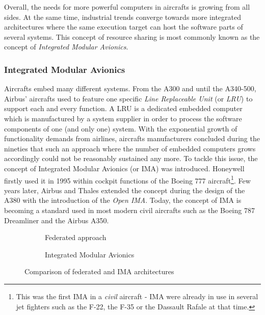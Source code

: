 \documentclass[main.tex]{subfiles}
\begin{document}
Overall, the needs for more powerful computers in aircrafts is growing from all sides. At the same time, industrial trends converge towards more integrated architectures where the same execution target can host the software parts of several systems. This concept of resource sharing is most commonly known as the concept of \emph{Integrated Modular Avionics}.




\subsubsection{Integrated Modular Avionics}
Aircrafts embed many different systems. From the A300 and until the A340-500, Airbus' aircrafts used to feature one specific \emph{Line Replaceable Unit} (or \emph{LRU}) to support each and every function. A LRU is a dedicated embedded computer which is manufactured by a system supplier in order to process the software components of one (and only one) system. With the exponential growth of functionality demands from airlines, aircrafts manufacturers concluded during the nineties that such an approach where the number of embedded computers grows accordingly could not be reasonably sustained any more. To tackle this issue, the concept of Integrated Modular Avionics (or IMA) was introduced. Honeywell firstly used it in 1995 within cockpit functions of the Boeing 777 aircraft\footnote{This was the first IMA in a \emph{civil} aircraft - IMA were already in use in several jet fighters such as the F-22, the F-35 or the Dassault Rafale at that time.}. Few years later, Airbus and Thales extended the concept during the design of the A380 with the introduction of the \emph{Open IMA}. Today, the concept of IMA is becoming a standard used in most modern civil aircrafts such as the Boeing 787 Dreamliner and the Airbus A350. 

\begin{figure}
    \centering

    \begin{subfigure}[b]{0.49\linewidth}
        \scalebox{0.9}{}
        \caption{Federated approach}
        \label{fig_intro_federatedApproach}
    \end{subfigure}
    \begin{subfigure}[b]{0.49\linewidth}
        \centering
        \scalebox{0.9}{}
        \caption{Integrated Modular Avionics}
        \label{fig_intro_IMA}
    \end{subfigure}
    \caption{Comparison of federated and IMA architectures}
    \label{fig_intro_comparisonFederatedVsIMA}
\end{figure}
\end{document}
